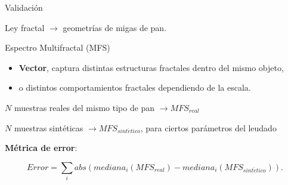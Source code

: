 \documentclass[spanish,unknownkeysallowed,10pt]{beamer}
\begin{document}
\begin{frame}{Validación}

Ley fractal $\rightarrow$ geometrías de migas de pan.

\begin{block}{Espectro Multifractal (MFS)}

\begin{itemize}
\item \textbf{Vector}, captura distintas estructuras fractales dentro del mismo objeto,
\item o distintos comportamientos fractales dependiendo de la escala.
\end{itemize}
\end{block}

$N$ muestras reales del mismo tipo de pan $\rightarrow MFS_{real}$

$N$ muestras sintéticas $\rightarrow MFS_{sint\acute{e}tico}$, para ciertos parámetros del leudado

\textbf{Métrica de error}:

\begin{equation*}
Error = \displaystyle \sum_{i} abs(mediana_{i}(MFS_{real})-mediana_{i}(MFS_{sint\acute{e}tico})).
\end{equation*}



\end{frame}
\end{document}
